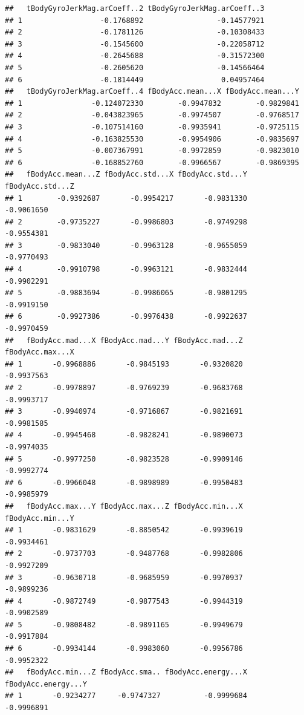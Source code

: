 \documentclass[
]{article}
\begin{document}
\begin{verbatim}
##   tBodyGyroJerkMag.arCoeff..2 tBodyGyroJerkMag.arCoeff..3
## 1                  -0.1768892                 -0.14577921
## 2                  -0.1781126                 -0.10308433
## 3                  -0.1545600                 -0.22058712
## 4                  -0.2645688                 -0.31572300
## 5                  -0.2605620                 -0.14566464
## 6                  -0.1814449                  0.04957464
##   tBodyGyroJerkMag.arCoeff..4 fBodyAcc.mean...X fBodyAcc.mean...Y
## 1                -0.124072330        -0.9947832        -0.9829841
## 2                -0.043823965        -0.9974507        -0.9768517
## 3                -0.107514160        -0.9935941        -0.9725115
## 4                -0.163825530        -0.9954906        -0.9835697
## 5                -0.007367991        -0.9972859        -0.9823010
## 6                -0.168852760        -0.9966567        -0.9869395
##   fBodyAcc.mean...Z fBodyAcc.std...X fBodyAcc.std...Y fBodyAcc.std...Z
## 1        -0.9392687       -0.9954217       -0.9831330       -0.9061650
## 2        -0.9735227       -0.9986803       -0.9749298       -0.9554381
## 3        -0.9833040       -0.9963128       -0.9655059       -0.9770493
## 4        -0.9910798       -0.9963121       -0.9832444       -0.9902291
## 5        -0.9883694       -0.9986065       -0.9801295       -0.9919150
## 6        -0.9927386       -0.9976438       -0.9922637       -0.9970459
##   fBodyAcc.mad...X fBodyAcc.mad...Y fBodyAcc.mad...Z fBodyAcc.max...X
## 1       -0.9968886       -0.9845193       -0.9320820       -0.9937563
## 2       -0.9978897       -0.9769239       -0.9683768       -0.9993717
## 3       -0.9940974       -0.9716867       -0.9821691       -0.9981585
## 4       -0.9945468       -0.9828241       -0.9890073       -0.9974035
## 5       -0.9977250       -0.9823528       -0.9909146       -0.9992774
## 6       -0.9966048       -0.9898989       -0.9950483       -0.9985979
##   fBodyAcc.max...Y fBodyAcc.max...Z fBodyAcc.min...X fBodyAcc.min...Y
## 1       -0.9831629       -0.8850542       -0.9939619       -0.9934461
## 2       -0.9737703       -0.9487768       -0.9982806       -0.9927209
## 3       -0.9630718       -0.9685959       -0.9970937       -0.9899236
## 4       -0.9872749       -0.9877543       -0.9944319       -0.9902589
## 5       -0.9808482       -0.9891165       -0.9949679       -0.9917884
## 6       -0.9934144       -0.9983060       -0.9956786       -0.9952322
##   fBodyAcc.min...Z fBodyAcc.sma.. fBodyAcc.energy...X fBodyAcc.energy...Y
## 1       -0.9234277     -0.9747327          -0.9999684          -0.9996891

\end{verbatim}
\end{document}
